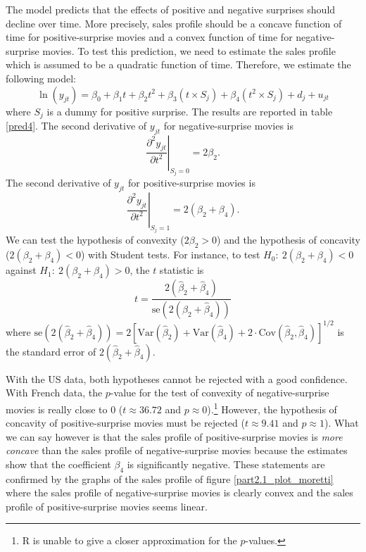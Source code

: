 The model predicts that the effects of positive and negative surprises should decline over time.
More precisely, sales profile should be a concave function of time for positive-surprise movies and a convex function of time for negative-surprise movies.
To test this prediction, we need to estimate the sales profile which is assumed to be a quadratic function of time.
Therefore, we estimate the following model:
\begin{equation*}
	\ln (y_{jt}) = \beta_0 + \beta_1 t + \beta_2 t^2 + \beta_3 (t \times S_j) + \beta_4 (t^2 \times S_j) + d_j + u_{jt}
\end{equation*}
where $S_j$ is a dummy for positive surprise.
The results are reported in table \ref{pred4}.
The second derivative of $y_{jt}$ for negative-surprise movies is 
\begin{equation*}
	\left.\frac{\partial^2 y_{jt}}{\partial t^2}\right|_{S_j=0} = 2 \beta_2.
\end{equation*}
The second derivative of $y_{jt}$ for positive-surprise movies is 
\begin{equation*}
	\left.\frac{\partial^2 y_{jt}}{\partial t^2}\right|_{S_j=1} = 2 (\beta_2 + \beta_4).
\end{equation*}
We can test the hypothesis of convexity ($2\beta_2 > 0$) and the hypothesis of concavity ($2(\beta_2 + \beta_4) < 0$) with Student tests.
For instance, to test $H_0:~2(\beta_2 + \beta_4) < 0$ against $H_1:~2(\beta_2 + \beta_4) > 0$, the $t$ statistic is
\begin{equation*}
	t = \frac{2(\hat{\beta}_2 + \hat{\beta}_4)}{\text{se}(2(\hat{\beta}_2 + \hat{\beta}_4))} 
\end{equation*}
where $\text{se}(2(\hat{\beta}_2 + \hat{\beta}_4)) = 2[\text{Var}(\hat{\beta}_2) + \text{Var}(\hat{\beta}_4) + 2\cdot \text{Cov}(\hat{\beta}_2, \hat{\beta}_4)]^{1/2}$ is the standard error of $2(\hat{\beta}_2 + \hat{\beta}_4)$.

With the US data, both hypotheses cannot be rejected with a good confidence.
With French data, the $p$-value for the test of convexity of negative-surprise movies is really close to 0 ($t \approx 36.72$ and $p \approx 0$).\footnote{R is unable to give a closer approximation for the $p$-values.}
However, the hypothesis of concavity of positive-surprise movies must be rejected ($t \approx 9.41$ and $p \approx 1$).
What we can say however is that the sales profile of positive-surprise movies is \textit{more concave} than the sales profile of negative-surprise movies because the estimates show that the coefficient $\beta_4$ is significantly negative.
These statements are confirmed by the graphs of the sales profile of figure \ref{part2.1_plot_moretti} where the sales profile of negative-surprise movies is clearly convex and the sales profile of positive-surprise movies seems linear.


